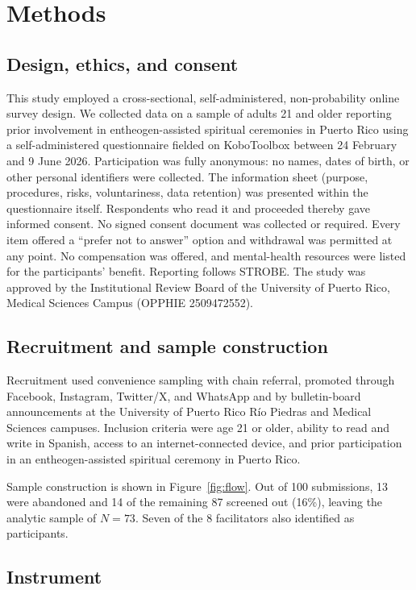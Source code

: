 \documentclass[12pt]{article}
\begin{document}
\section{Methods}

\subsection{Design, ethics, and consent}

This study employed a cross-sectional, self-administered, non-probability online survey design. We collected
data on a sample of adults 21 and older reporting prior involvement in entheogen-assisted spiritual
ceremonies in Puerto Rico using a self-administered questionnaire fielded on KoboToolbox
\citep{kobotoolbox2026} between 24 February and 9 June 2026. Participation was fully anonymous: no names,
dates of birth, or other personal identifiers were collected. The information sheet (purpose, procedures,
risks, voluntariness, data retention) was presented within the questionnaire itself. Respondents who read it
and proceeded thereby gave informed consent. No signed consent document was collected or required. Every
item offered a ``prefer not to answer'' option and withdrawal was permitted at any point. No compensation
was offered, and mental-health resources were listed for the participants' benefit. Reporting follows STROBE. The study was approved by the Institutional Review Board of
the University of Puerto Rico, Medical Sciences Campus (OPPHIE 2509472552).

\subsection{Recruitment and sample construction}

Recruitment used convenience sampling with chain referral, promoted through Facebook, Instagram, Twitter/X,
and WhatsApp and by bulletin-board announcements at the University of Puerto Rico R\'io Piedras and Medical
Sciences campuses. Inclusion criteria were age 21 or older, ability to read and write in Spanish, access to
an internet-connected device, and prior participation in an entheogen-assisted spiritual ceremony in Puerto
Rico.

Sample construction is shown in Figure~\ref{fig:flow}. Out of 100 submissions, 13 were abandoned and 14 of
the remaining 87 screened out (16\%), leaving the analytic sample of $N=73$. Seven of the 8 facilitators
also identified as participants.

\subsection{Instrument}
\end{document}
